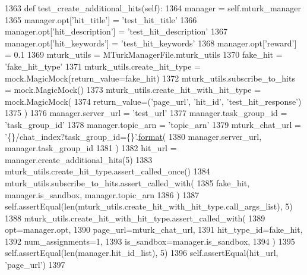 \begin{DoxyCode}
1363     \textcolor{keyword}{def }test\_create\_additional\_hits(self):
1364         manager = self.mturk\_manager
1365         manager.opt[\textcolor{stringliteral}{'hit\_title'}] = \textcolor{stringliteral}{'test\_hit\_title'}
1366         manager.opt[\textcolor{stringliteral}{'hit\_description'}] = \textcolor{stringliteral}{'test\_hit\_description'}
1367         manager.opt[\textcolor{stringliteral}{'hit\_keywords'}] = \textcolor{stringliteral}{'test\_hit\_keywords'}
1368         manager.opt[\textcolor{stringliteral}{'reward'}] = 0.1
1369         mturk\_utils = MTurkManagerFile.mturk\_utils
1370         fake\_hit = \textcolor{stringliteral}{'fake\_hit\_type'}
1371         mturk\_utils.create\_hit\_type = mock.MagicMock(return\_value=fake\_hit)
1372         mturk\_utils.subscribe\_to\_hits = mock.MagicMock()
1373         mturk\_utils.create\_hit\_with\_hit\_type = mock.MagicMock(
1374             return\_value=(\textcolor{stringliteral}{'page\_url'}, \textcolor{stringliteral}{'hit\_id'}, \textcolor{stringliteral}{'test\_hit\_response'})
1375         )
1376         manager.server\_url = \textcolor{stringliteral}{'test\_url'}
1377         manager.task\_group\_id = \textcolor{stringliteral}{'task\_group\_id'}
1378         manager.topic\_arn = \textcolor{stringliteral}{'topic\_arn'}
1379         mturk\_chat\_url = \textcolor{stringliteral}{'\{\}/chat\_index?task\_group\_id=\{\}'}.\hyperlink{namespaceparlai_1_1chat__service_1_1services_1_1messenger_1_1shared__utils_a32e2e2022b824fbaf80c747160b52a76}{format}(
1380             manager.server\_url, manager.task\_group\_id
1381         )
1382         hit\_url = manager.create\_additional\_hits(5)
1383         mturk\_utils.create\_hit\_type.assert\_called\_once()
1384         mturk\_utils.subscribe\_to\_hits.assert\_called\_with(
1385             fake\_hit, manager.is\_sandbox, manager.topic\_arn
1386         )
1387         self.assertEqual(len(mturk\_utils.create\_hit\_with\_hit\_type.call\_args\_list), 5)
1388         mturk\_utils.create\_hit\_with\_hit\_type.assert\_called\_with(
1389             opt=manager.opt,
1390             page\_url=mturk\_chat\_url,
1391             hit\_type\_id=fake\_hit,
1392             num\_assignments=1,
1393             is\_sandbox=manager.is\_sandbox,
1394         )
1395         self.assertEqual(len(manager.hit\_id\_list), 5)
1396         self.assertEqual(hit\_url, \textcolor{stringliteral}{'page\_url'})
1397 
\end{DoxyCode}
\mbox{\label{classparlai_1_1mturk_1_1core_1_1dev_1_1test_1_1test__mturk__manager_1_1TestMTurkManagerConnectedFunctions_a3fab685b210500647083aac1cc85d55e}} 
